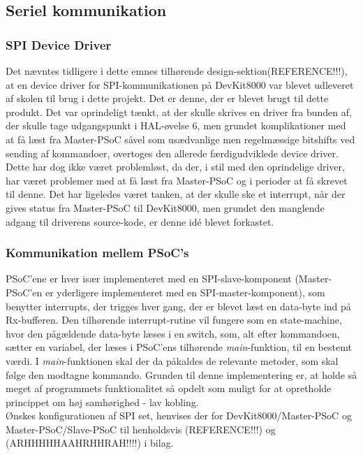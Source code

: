 \subsection{Seriel kommunikation}

\subsubsection{SPI Device Driver}
Det nævntes tidligere i dette emnes tilhørende design-sektion(REFERENCE!!!), at en device driver for SPI-kommunikationen på DevKit8000 var blevet udleveret af skolen til brug i dette projekt. Det er denne, der er blevet brugt til dette produkt. Det var oprindeligt tænkt, at der skulle skrives en driver fra bunden af, der skulle tage udgangspunkt i HAL-øvelse 6, men grundet komplikationer med at få læst fra Master-PSoC såvel som usædvanlige men regelmæssige bitshifts ved sending af kommandoer, overtoges den allerede færdigudviklede device driver. Dette har dog ikke været problemløst, da der, i stil med den oprindelige driver, har været problemer med at få læst fra Master-PSoC og i perioder at få skrevet til denne. Det har ligeledes været tanken, at der skulle ske et interrupt, når der gives status fra Master-PSoC til DevKit8000, men grundet den manglende adgang til driverens source-kode, er denne idé blevet forkastet. \\

\subsubsection{Kommunikation mellem PSoC's}
PSoC'ene er hver især implementeret med en SPI-slave-komponent (Master-PSoC'en er yderligere implementeret med en SPI-master-komponent), som benytter interrupts, der trigges hver gang, der er blevet læst en data-byte ind på Rx-bufferen. Den tilhørende interrupt-rutine vil fungere som en state-machine, hvor den pågældende data-byte læses i en switch, som, alt efter kommandoen, sætter en variabel, der læses i PSoC'ens tilhørende \textit{main}-funktion, til en bestemt værdi. I \textit{main}-funktionen skal der da påkaldes de relevante metoder, som skal følge den modtagne kommando. Grunden til denne implementering er, at holde så meget af programmets funktionalitet så opdelt som muligt for at opretholde princippet om høj samhørighed - lav kobling. \\

Ønskes konfigurationen af SPI set, henvises der for DevKit8000/Master-PSoC og Master-PSoC/Slave-PSoC til henholdsvis (REFERENCE!!!) og (ARHHHHHAAHRHHRAH!!!!) i bilag. \\

